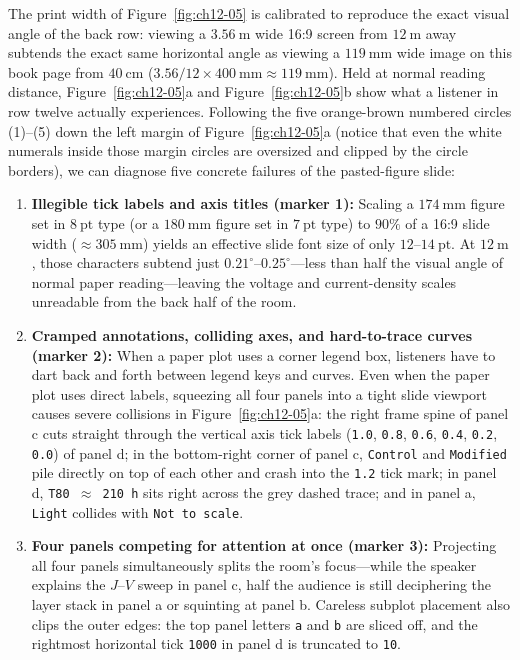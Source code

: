 The print width of Figure~\ref{fig:ch12-05} is calibrated to reproduce the exact visual angle of the back row: viewing a $3.56\ \text{m}$ wide 16:9 screen from $12\ \text{m}$ away subtends the exact same horizontal angle as viewing a $119\ \text{mm}$ wide image on this book page from $40\ \text{cm}$ ($3.56 / 12 \times 400\ \text{mm} \approx 119\ \text{mm}$). Held at normal reading distance, Figure~\ref{fig:ch12-05}a and Figure~\ref{fig:ch12-05}b show what a listener in row twelve actually experiences. Following the five orange-brown numbered circles (1)--(5) down the left margin of Figure~\ref{fig:ch12-05}a (notice that even the white numerals inside those margin circles are oversized and clipped by the circle borders), we can diagnose five concrete failures of the pasted-figure slide:
\begin{enumerate}
\item \textbf{Illegible tick labels and axis titles (marker 1):} Scaling a $174\ \text{mm}$ figure set in $8\ \text{pt}$ type (or a $180\ \text{mm}$ figure set in $7\ \text{pt}$ type) to $90\%$ of a 16:9 slide width ($\approx 305\ \text{mm}$) yields an effective slide font size of only $12\text{--}14\ \text{pt}$. At $12\ \text{m}$, those characters subtend just $0.21^\circ\text{--}0.25^\circ$---less than half the visual angle of normal paper reading---leaving the voltage and current-density scales unreadable from the back half of the room.
\item \textbf{Cramped annotations, colliding axes, and hard-to-trace curves (marker 2):} When a paper plot uses a corner legend box, listeners have to dart back and forth between legend keys and curves. Even when the paper plot uses direct labels, squeezing all four panels into a tight slide viewport causes severe collisions in Figure~\ref{fig:ch12-05}a: the right frame spine of panel c cuts straight through the vertical axis tick labels (\texttt{1.0}, \texttt{0.8}, \texttt{0.6}, \texttt{0.4}, \texttt{0.2}, \texttt{0.0}) of panel d; in the bottom-right corner of panel c, \texttt{Control} and \texttt{Modified} pile directly on top of each other and crash into the \texttt{1.2} tick mark; in panel d, \texttt{T80 $\approx$ 210 h} sits right across the grey dashed trace; and in panel a, \texttt{Light} collides with \texttt{Not to scale}.
\item \textbf{Four panels competing for attention at once (marker 3):} Projecting all four panels simultaneously splits the room's focus---while the speaker explains the $J\text{--}V$ sweep in panel c, half the audience is still deciphering the layer stack in panel a or squinting at panel b. Careless subplot placement also clips the outer edges: the top panel letters \texttt{a} and \texttt{b} are sliced off, and the rightmost horizontal tick \texttt{1000} in panel d is truncated to \texttt{10}.

\end{enumerate}
